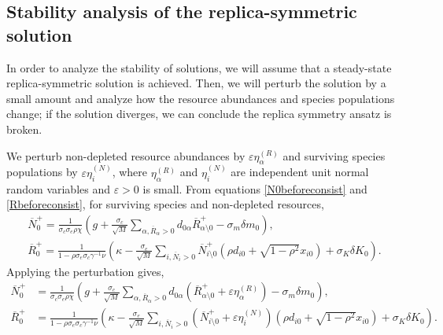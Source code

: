 \documentclass[10pt]{article}
\begin{document}
\newpage

\subsection{Stability analysis of the replica-symmetric solution}

In order to analyze the stability of solutions, we will assume that a steady-state replica-symmetric solution is achieved.
Then, we will perturb the solution by a small amount and analyze how the resource abundances and species populations change; if the solution diverges, we can conclude the replica symmetry ansatz is broken.

We perturb non-depleted resource abundances by $\varepsilon\eta^{(R)}_\alpha$ and surviving species populations by $\varepsilon\eta^{(N)}_i$, where $\eta^{(R)}_\alpha$ and $\eta^{(N)}_i$ are independent unit normal random variables and $\varepsilon>0$ is small.
From equations \ref{N0beforeconsist} and \ref{Rbeforeconsist}, for surviving species and non-depleted resources,
\begin{gather}
	\overline N_0^+
	= 
	\frac{1}{\sigma_c \sigma_e \rho \chi }
	\left(
	g 
	+
	\frac{\sigma_c}{\sqrt{M}}
	\sum_{\alpha ,\overline R_\alpha>0} d_{0\alpha} \overline R_{\alpha \setminus 0}^+
	-
	\sigma_m \delta m_0
	\right),
	\\
	\overline R_0^+
	=
	\frac{1}{1
	-
	\rho \sigma_e \sigma_c \gamma^{-1} \nu }
	\left(
	\kappa
	-
	\frac{\sigma_e}{\sqrt{M}}
	\sum_{i,\overline N_i>0}
	\overline N_{i \setminus 0}^+
	\left(
		\rho d_{i0}
		+
		\sqrt{1-\rho^2}x_{i0}
	\right)
	+
	\sigma_K \delta K_0
	\right).
\end{gather}
Applying the perturbation gives,
\begin{align}
	\overline N_0^+
	&= 
	\frac{1}{\sigma_c \sigma_e \rho \chi }
	\left(
	g 
	+
	\frac{\sigma_c}{\sqrt{M}}
	\sum_{\alpha ,\overline R_\alpha>0} d_{0\alpha} \left(
		\overline R_{\alpha \setminus 0}^+
		+
		\varepsilon \eta_{\alpha}^{(R)}
	\right)
	-
	\sigma_m \delta m_0
	\right),
	\\
	\overline R_0^+
	&=
	\frac{1}{1
	-
	\rho \sigma_e \sigma_c \gamma^{-1} \nu }
	\left(
	\kappa
	-
	\frac{\sigma_e}{\sqrt{M}}
	\sum_{i,\overline N_i>0}
	\left(
		\overline N_{i \setminus 0}^+
		+
		\varepsilon \eta_i^{(N)}
	\right)
	\left(
		\rho d_{i0}
		+
		\sqrt{1-\rho^2}x_{i0}
	\right)
	+
	\sigma_K \delta K_0
	\right).
\end{align}
\end{document}
